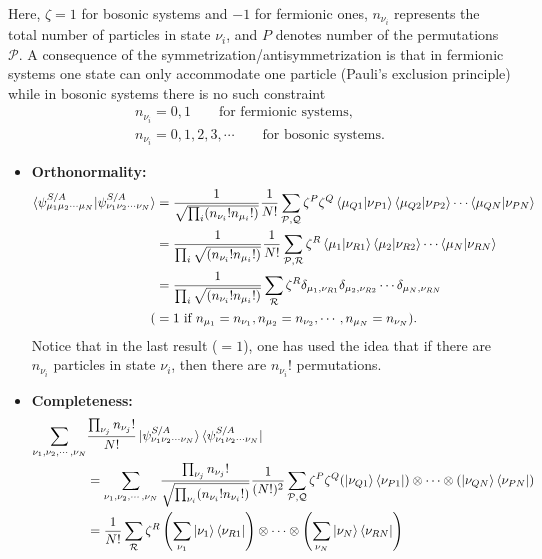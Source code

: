 \documentclass[a4paper,12pts]{article}
\numberwithin{equation}{section}
\begin{document}
	Here, $\zeta = 1$ for bosonic systems and $-1$ for fermionic ones, $n_{\nu_i}$ represents the total number of particles in state $\nu_i$, and $P$ denotes number of the permutations $\mathcal{P}$. A consequence of the symmetrization/antisymmetrization is that in fermionic systems one state can only accommodate one particle (Pauli's exclusion principle) while in bosonic systems there is no such constraint
	\begin{eqnarray}
	&n_{\nu_i} = 0,1 \qquad \text{for fermionic systems},&\\
	&n_{\nu_i} = 0,1,2,3,\cdots \qquad \text{for bosonic systems}.&
	\end{eqnarray}
	\begin{itemize}
		\item \textbf{Orthonormality:}
		\begin{align}
		\braket{\psi_{\mu_1\mu_2\cdots\mu_N}^{S/A}|\psi_{\nu_1\nu_2\cdots\nu_N}^{S/A}} &= \frac{1}{\sqrt{\prod_{i}(n_{\nu_i}!n_{\mu_i}!)}}\frac{1}{N!}\sum_{\mathcal{P},\mathcal{Q}}\zeta^P\zeta^Q\braket{\mu_{Q1}|\nu_{P1}}\braket{\mu_{Q2}|\nu_{P2}}\cdots\braket{\mu_{QN}|\nu_{PN}}\\
		&= \frac{1}{\prod_{i}\sqrt{(n_{\nu_i}!n_{\mu_i}!)}}\frac{1}{N!}\sum_{\mathcal{P},\mathcal{R}}\zeta^R\braket{\mu_1|\nu_{R1}}\braket{\mu_2|\nu_{R2}}\cdots\braket{\mu_N|\nu_{RN}}\\
		&= \frac{1}{\prod_{i}\sqrt{(n_{\nu_i}!n_{\mu_i}!)}}\sum_{\mathcal{R}}\zeta^R\delta_{\mu_1,\nu_{R1}}\delta_{\mu_2,\nu_{R2}}\cdots\delta_{\mu_N,\nu_{RN}}\label{def:ortho}\\
		(&= 1 \text{ if } n_{\mu_1}=n_{\nu_1}, n_{\mu_2}=n_{\nu_2},\cdots,n_{\mu_N}=n_{\nu_N}).
		\end{align}
		Notice that in the last result ($=1$), one has used the idea that if there are $n_{\nu_i}$ particles in state $\nu_i$, then there are $n_{\nu_i}!$ permutations.
		\item \textbf{Completeness:}
		\begin{align}
		\sum_{\nu_1,\nu_2,\cdots,\nu_N}&\frac{\prod_{\nu_j}n_{\nu_j}!}{N!} \ket{\psi_{\nu_1\nu_2\cdots\nu_N}^{S/A}}\bra{\psi_{\nu_1\nu_2\cdots\nu_N}^{S/A}}\nonumber\\
		&= \sum_{\nu_1,\nu_2,\cdots,\nu_N}\frac{\prod_{\nu_j}n_{\nu_j}!}{\sqrt{\prod_{\nu_i}(n_{\nu_i}!n_{\nu_i}!)}}\frac{1}{(N!)^2}\sum_{\mathcal{P},\mathcal{Q}}\zeta^P\zeta^Q(\ket{\nu_{Q1}}\bra{\nu_{P1}})\otimes\cdots\otimes(\ket{\nu_{QN}}\bra{\nu_{PN}})\\
		&= \frac{1}{N!}\sum_{\mathcal{R}}\zeta^R\left(\sum_{\nu_1}\ket{\nu_{1}}\bra{\nu_{R1}}\right)\otimes\cdots\otimes\left(\sum_{\nu_N}\ket{\nu_{N}}\bra{\nu_{RN}}\right)\\

\end{align}
\end{itemize}
\end{document}
